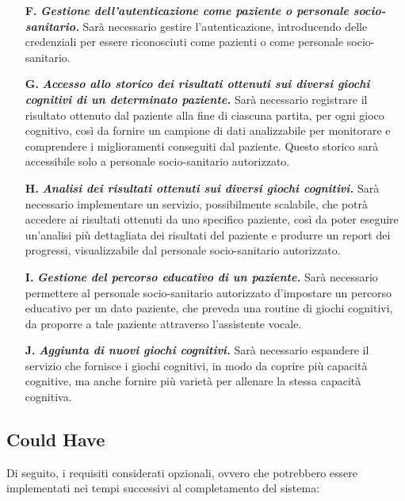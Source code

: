 \begin{enumerate}
  \item[\textbf{F.}] \textit{\textbf{Gestione dell’autenticazione come paziente
            o personale socio-sanitario.}} Sarà necessario gestire
        l’autenticazione, introducendo delle credenziali per essere
        riconosciuti come pazienti o come personale socio-sanitario.
  \item[\textbf{G.}] \textit{\textbf{Accesso allo storico dei risultati
            ottenuti sui diversi giochi cognitivi di un determinato paziente.}}
        Sarà necessario registrare il risultato ottenuto dal paziente alla fine
        di ciascuna partita, per ogni gioco cognitivo, così da fornire un
        campione di dati analizzabile per monitorare e comprendere i
        miglioramenti conseguiti dal paziente. Questo storico sarà accessibile
        solo a personale socio-sanitario autorizzato.
  \item[\textbf{H.}] \textit{\textbf{Analisi dei risultati ottenuti sui diversi
            giochi cognitivi.}} Sarà necessario implementare un servizio,
        possibilmente scalabile, che potrà accedere ai risultati ottenuti
        da uno specifico paziente, così da poter eseguire un’analisi più
        dettagliata dei risultati del paziente e produrre un report dei
        progressi, visualizzabile dal personale socio-sanitario
        autorizzato.
  \item[\textbf{I.}] \textit{\textbf{Gestione del percorso educativo di un
            paziente.}} Sarà necessario permettere al personale socio-sanitario
        autorizzato d'impostare un percorso educativo per un dato
        paziente, che preveda una routine di giochi cognitivi, da proporre
        a tale paziente attraverso l’assistente vocale.
  \item[\textbf{J.}] \textit{\textbf{Aggiunta di nuovi giochi cognitivi.}}
        Sarà necessario espandere il servizio che fornisce i giochi cognitivi,
        in modo da coprire più capacità cognitive, ma anche fornire più varietà
        per allenare la stessa capacità cognitiva.
\end{enumerate}

\subsection{Could Have}
\label{subsec:Sezione2.1.3}

Di seguito, i requisiti considerati opzionali, ovvero che potrebbero essere
implementati nei tempi successivi al completamento del sistema:

